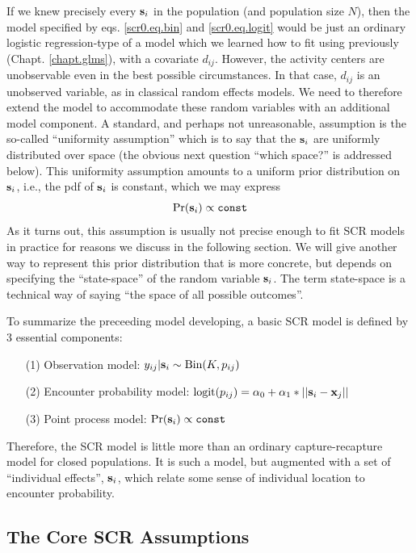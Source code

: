 If we knew precisely every ${\bf s}_{i}$ in the population (and
population size $N$), then the model specified by
eqs. \ref{scr0.eq.bin} and \ref{scr0.eq.logit} would be just an
ordinary logistic regression-type of a model which we learned how to
fit using \winbugs previously (Chapt. \ref{chapt.glms}), with a
covariate $d_{ij}$. However, the activity centers are unobservable
even in the best possible circumstances. In that case, $d_{ij}$ is an
unobserved variable, as in classical random effects models. We need to
therefore extend the model to accommodate these random variables with
an additional model component. A standard, and perhaps not
unreasonable, assumption is the so-called ``uniformity assumption''
which is to say that the ${\bf s}_{i}$ are uniformly distributed over
space (the obvious next question ``which space?'' is addressed below).
This uniformity assumption amounts to a uniform prior distribution on
${\bf s}_{i}$, i.e., the pdf of ${\bf s}_{i}$ is constant, which we
may express
\begin{equation}
	\Pr({\bf s}_{i}) \propto \mbox{\tt const}
\label{scr0.eq.sprior}
\end{equation}
 As it turns out, this assumption is usually not precise
enough to fit SCR models in practice for reasons we discuss in the
following section.  We will give another way to represent this prior
distribution that is more concrete, but depends on specifying the
``state-space'' of the random variable ${\bf s}_{i}$. The term
state-space is a technical way of saying ``the space of all possible outcomes''.

To summarize the preceeding model developing, a basic SCR model is
defined by 3 essential components:
\begin{itemize}
\item[(1)] Observation model: $y_{ij}|{\bf s}_{i} \sim \mbox{Bin}(K, p_{ij})$
\item[(2)] Encounter probability model: $\mbox{logit}(p_{ij}) = \alpha_{0} +
  \alpha_{1}*||{\bf s}_{i}-{\bf x}_{j}||$
\item[(3)] Point process model: $\Pr({\bf s}_{i} ) \propto \mbox{\tt const}$
\end{itemize}
Therefore, the SCR model is little more than an ordinary
capture-recapture model for closed populations. It is such a model,
but augmented with a set of ``individual effects'', ${\bf s}_{i}$,
which relate some sense of individual location to encounter
probability. 

\subsection{The Core SCR Assumptions}


